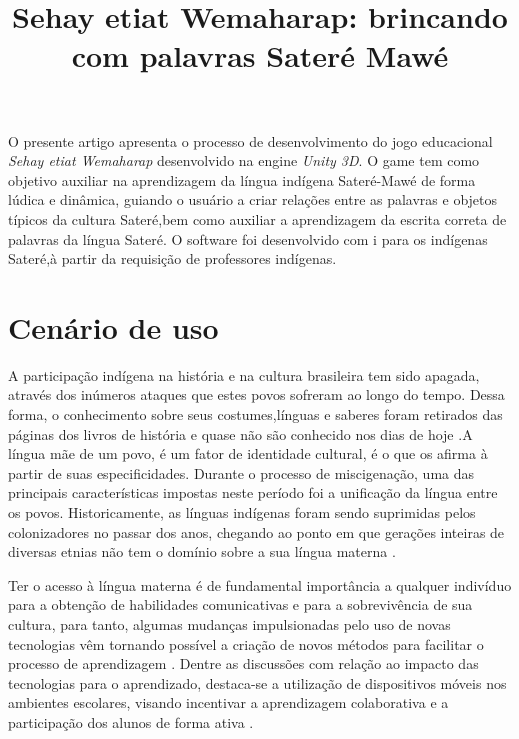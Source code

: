 \documentclass[12pt]{article}
\title{Sehay etiat Wemaharap: brincando com palavras Sateré Mawé}
\begin{document}
 

\maketitle
	
	\begin{resumo} 
		O presente artigo apresenta o processo de desenvolvimento do jogo educacional  \textit{Sehay etiat Wemaharap} desenvolvido na engine \textit{Unity 3D}. O game tem como objetivo auxiliar na aprendizagem da língua indígena Sateré-Mawé de forma lúdica e dinâmica, guiando o usuário a criar relações entre as palavras e objetos típicos da cultura Sateré,bem como auxiliar a aprendizagem da escrita correta de palavras da língua Sateré. O software foi desenvolvido com i para os indígenas Sateré,à partir da requisição de professores indígenas.
	\end{resumo}
	
	\section{Cenário de uso}
		A participação indígena na história e na cultura brasileira tem sido apagada, através dos inúmeros ataques que estes povos sofreram ao longo do tempo. Dessa forma, o conhecimento sobre seus costumes,línguas e saberes foram retirados das páginas dos livros de história e quase não são conhecido nos dias de hoje \cite{seki2000linguas}.A língua mãe de um povo, é um fator de identidade cultural, é o que os afirma à partir de suas especificidades. Durante o processo de miscigenação, uma das principais características impostas neste período foi a unificação da língua entre os povos. Historicamente, as línguas indígenas foram sendo suprimidas pelos colonizadores no passar dos anos, chegando ao ponto em que gerações inteiras de diversas etnias não tem o domínio sobre a sua língua materna \cite{cunha2008politicas}.
		
		Ter o acesso à língua materna é de fundamental importância a qualquer indivíduo para a obtenção de habilidades comunicativas e para a sobrevivência de sua cultura\cite{de Souza Pires et al. 2018}, para tanto, algumas mudanças impulsionadas pelo uso de novas tecnologias vêm tornando possível a criação de novos métodos para facilitar o processo de aprendizagem \cite{yamato2017amargana}. Dentre as discussões com relação ao impacto das tecnologias para o aprendizado, destaca-se a utilização de dispositivos móveis nos ambientes escolares, visando incentivar a aprendizagem colaborativa e a participação dos alunos de forma ativa \cite{rossing2012ilearning}.
		
\end{document}

